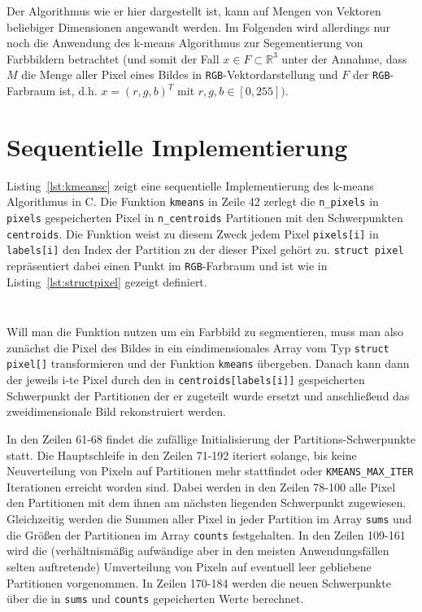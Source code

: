 \documentclass[
    bibliography=totoc, cd=lightcolor, cdmath=false, ngerman]{tudscrreprt}
\begin{document}
Der Algorithmus wie er hier dargestellt ist, kann auf Mengen von Vektoren
beliebiger Dimensionen angewandt werden. Im Folgenden wird allerdings nur noch
die Anwendung des k-means Algorithmus zur Segementierung von Farbbildern
betrachtet (und somit der Fall $x \in F \subset \mathbb{R}^3$ unter der
Annahme, dass $M$ die Menge aller Pixel eines Bildes in
\texttt{RGB}-Vektordarstellung und $F$ der \texttt{RGB}-Farbraum ist, d.h. $x =
(r, g, b)^T$ mit $r, g, b \in [0, 255])$.

\section{Sequentielle Implementierung}

Listing~\ref{lst:kmeansc} zeigt eine sequentielle Implementierung des k-means
Algorithmus in C. Die Funktion \texttt{kmeans} in Zeile 42 zerlegt die
\texttt{n\_pixels} in \texttt{pixels} gespeicherten Pixel in
\texttt{n\_centroids} Partitionen mit den Schwerpunkten \texttt{centroids}. Die
Funktion weist zu diesem Zweck jedem Pixel \texttt{pixels[i]} in
\texttt{labels[i]} den Index der Partition zu der dieser Pixel gehört zu.
\texttt{struct pixel} repräsentiert dabei einen Punkt im \texttt{RGB}-Farbraum
und ist wie in Listing~\ref{lst:structpixel} gezeigt definiert.

\inputminted[lastline=203, label=kmeansc]{C}{c/src/kmeans.c}

\inputminted[firstline=4, lastline=7]{C}{c/include/kmeans.h}

Will man die Funktion nutzen um ein Farbbild zu segmentieren, muss man also
zunächst die Pixel des Bildes in ein eindimensionales Array vom Typ
\texttt{struct pixel[]} transformieren und der Funktion \texttt{kmeans}
übergeben. Danach kann dann der jeweils i-te Pixel durch den in
\texttt{centroids[labels[i]]} gespeicherten Schwerpunkt der Partitionen der er
zugeteilt wurde ersetzt und anschließend das zweidimensionale Bild
rekonstruiert werden.

In den Zeilen 61-68 findet die zufällige Initialisierung der
Partitions-Schwerpunkte statt. Die Hauptschleife in den Zeilen 71-192 iteriert
solange, bis keine Neuverteilung von Pixeln auf Partitionen mehr stattfindet
oder \texttt{KMEANS\_MAX\_ITER} Iterationen erreicht worden sind. Dabei werden
in den Zeilen 78-100 alle Pixel den Partitionen mit dem ihnen am nächsten
liegenden Schwerpunkt zugewiesen. Gleichzeitig werden die Summen aller Pixel in
jeder Partition im Array \texttt{sums} und die Größen der Partitionen im Array
\texttt{counts} festgehalten. In den Zeilen 109-161 wird die (verhältnismäßig
aufwändige aber in den meisten Anwendungsfällen selten auftretende)
Umverteilung von Pixeln auf eventuell leer gebliebene Partitionen vorgenommen.
In Zeilen 170-184 werden die neuen Schwerpunkte über die in \texttt{sums} und
\texttt{counts} gepeicherten Werte berechnet.
\end{document}
